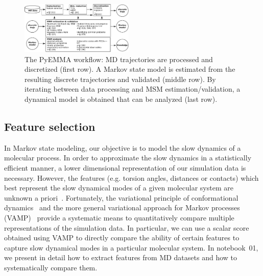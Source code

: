 \documentclass[9pt,tutorial]{livecoms}
\begin{document}
\begin{figure}[bt]
\includegraphics[width=0.48\textwidth]{figure_2}
\caption{The PyEMMA workflow: MD trajectories are processed and discretized (first row).
A Markov state model is estimated from the resulting discrete trajectories and validated (middle row).
By iterating between data processing and MSM estimation/validation,
a dynamical model is obtained that can be analyzed (last row).}
\label{fig:workflowchart}
\end{figure}

\subsection{Feature selection}

In Markov state modeling, our objective is to model the slow dynamics of a molecular process.
In order to approximate the slow dynamics in a statistically efficient manner,
a lower dimensional representation of our simulation data is necessary.
However, the features (e.g. torsion angles, distances or contacts) which best represent the slow dynamical modes of a given molecular system are unknown a priori~\cite{NoeClementiReview}.
Fortunately, the variational principle of conformational dynamics~\cite{noe-vac,nueske-vamk}
and the more general variational approach for Markov processes (VAMP)~\cite{vamp-preprint}
provide a systematic means to quantitatively compare multiple representations of the simulation data.
In particular, we can use a scalar score obtained using VAMP to directly compare the ability of certain features to capture slow dynamical modes in a particular molecular system.
In notebook~01, we present in detail how to extract features from MD datasets and how to systematically compare them.
\end{document}
